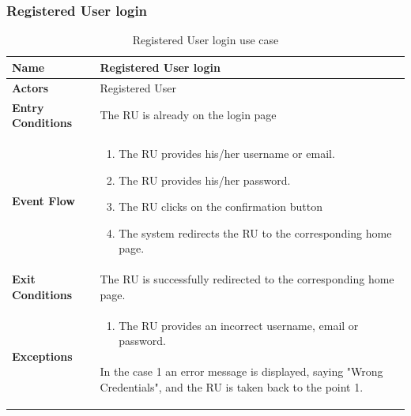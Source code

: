 					\subsubsection{Registered User login}
					\begin{table}[!h]
						\centering
						\vspace{-5mm}
						\begin{tabular}{lp{}}
							\toprule
							\textbf{Name} & \textbf{Registered User login} \\[1mm]
							\midrule
							\textbf{Actors} & Registered User \\[1mm]
							\textbf{Entry Conditions} & The RU is already on the login page \vspace{1mm}\\
							\textbf{Event Flow} &
							\vspace{-5mm} 
							\begin{enumerate}
								\setlength\itemsep{0.2mm}
								\item The RU provides his/her username or email.
								\item The RU provides his/her password.
								\item The RU clicks on the confirmation button
								\item The system redirects the RU to the corresponding home page.
							\end{enumerate} \\
							\textbf{Exit Conditions} & The RU is successfully redirected to the corresponding home page. \vspace{1mm}\\
							\textbf{Exceptions} &
							\vspace{-5mm} 
							\begin{enumerate}
								\item The RU provides an incorrect username, email or password.
							\end{enumerate}
							\vspace{-7mm}
							\paragraph{}
								In the case 1 an error message is displayed, saying "Wrong Credentials", and the RU is taken
back to the point 1. \\[1mm]
							\bottomrule
						\end{tabular}
						\caption{Registered User login use case}
					\end{table}
					\vspace{-7.5mm}

